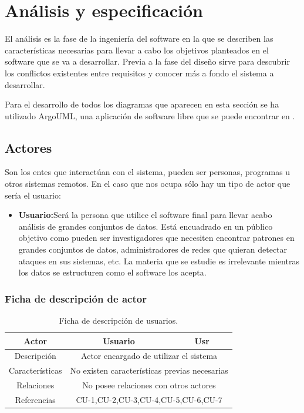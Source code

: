 \chapter{Análisis y especificación}

El análisis es la fase de la ingeniería del software en la que se describen las características necesarias para llevar a cabo los objetivos planteados en el software que se va a desarrollar. Previa a la fase del diseño sirve para descubrir los conflictos existentes entre requisitos y conocer más a fondo el sistema a desarrollar.
\bigskip

Para el desarrollo de todos los diagramas que aparecen en esta sección se ha utilizado ArgoUML, una aplicación de software libre que se puede encontrar en \cite{ARG}.
\bigskip

\section{Actores}
Son los entes que interactúan con el sistema, pueden ser personas, programas u otros sistemas remotos. En el caso que nos ocupa sólo hay un tipo de actor que sería el usuario:
\bigskip

\begin{itemize}
\item \textbf{Usuario:}Será la persona que utilice el software final para llevar acabo análisis de grandes conjuntos de datos. Está encuadrado en un público objetivo como pueden ser investigadores que necesiten encontrar patrones en grandes conjuntos de datos, administradores de redes que quieran detectar ataques en sus sistemas, etc. 
La materia que se estudie es irrelevante mientras los datos se estructuren como el software los acepta.
\end{itemize}
\bigskip

\subsection{Ficha de descripción de actor}

\begin{table}[H]
\begin{center}
\resizebox{10cm}{!} {
\begin{tabular}{|c|c|c|}
\hline
Actor & Usuario & Usr	\\ \hline
Descripción &\multicolumn{2}{|c|}{Actor encargado de utilizar el sistema}	\\ \hline
Características & \multicolumn{2}{|c|}{No existen características previas necesarias}	\\ \hline
Relaciones & \multicolumn{2}{|c|}{No posee relaciones con otros actores}	\\ \hline
Referencias &\multicolumn{2}{|c|}{CU-1,CU-2,CU-3,CU-4,CU-5,CU-6,CU-7}	\\ \hline
\end{tabular}
}
\caption{Ficha de descripción de usuarios.}
\end{center}
\end{table}

